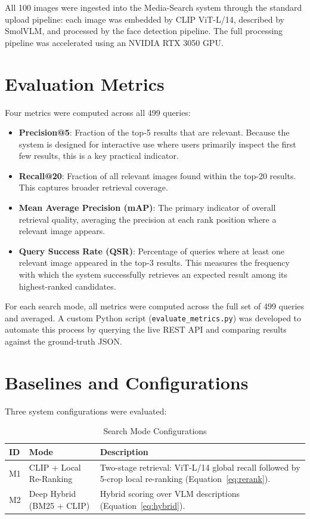 \documentclass[12pt,a4paper,oneside]{report}
\begin{document}
All 100 images were ingested into the Media-Search system through the standard upload pipeline: each image was embedded by CLIP ViT-L/14, described by SmolVLM, and processed by the face detection pipeline. The full processing pipeline was accelerated using an NVIDIA RTX 3050 GPU.

\section{Evaluation Metrics}

Four metrics were computed across all 499 queries:

\begin{itemize}[leftmargin=*]
  \item \textbf{Precision@5}: Fraction of the top-5 results that are relevant. Because the system is designed for interactive use where users primarily inspect the first few results, this is a key practical indicator.
  \item \textbf{Recall@20}: Fraction of all relevant images found within the top-20 results. This captures broader retrieval coverage.
  \item \textbf{Mean Average Precision (mAP)}: The primary indicator of overall retrieval quality, averaging the precision at each rank position where a relevant image appears.
  \item \textbf{Query Success Rate (QSR)}: Percentage of queries where at least one relevant image appeared in the top-3 results. This measures the frequency with which the system successfully retrieves an expected result among its highest-ranked candidates.
\end{itemize}

For each search mode, all metrics were computed across the full set of 499 queries and averaged. A custom Python script (\texttt{evaluate\_metrics.py}) was developed to automate this process by querying the live REST API and comparing results against the ground-truth JSON.

\section{Baselines and Configurations}

Three system configurations were evaluated:

\begin{table}[H]
\centering\small
\caption{Search Mode Configurations}
\label{tab:configs}
\renewcommand{\arraystretch}{1.4}
\begin{tabular}{|p{1.2cm}|p{4.5cm}|p{7.5cm}|}
\hline
\textbf{ID} & \textbf{Mode} & \textbf{Description} \\
\hline
M1 & CLIP + Local Re-Ranking & Two-stage retrieval: ViT-L/14 global recall followed by 5-crop local re-ranking (Equation~\ref{eq:rerank}). \\
\hline
M2 & Deep Hybrid (BM25 + CLIP) & Hybrid scoring over VLM descriptions (Equation~\ref{eq:hybrid}). \\
\hline
\end{tabular}
\end{table}
\end{document}
